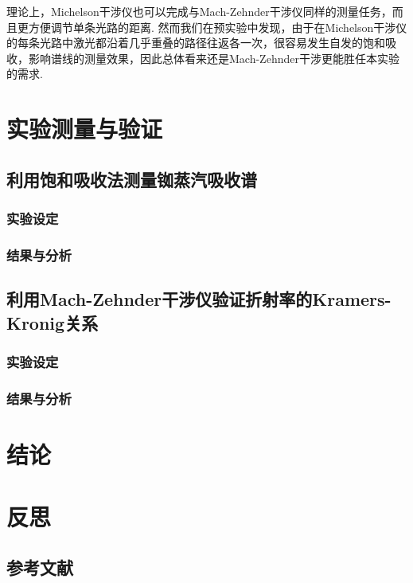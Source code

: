 \documentclass[a4paper, 10pt]{article}
\begin{document}
\begin{multicols}{2}
理论上，Michelson干涉仪也可以完成与Mach-Zehnder干涉仪同样的测量任务，而且更方便调节单条光路的距离. 然而我们在预实验中发现，由于在Michelson干涉仪的每条光路中激光都沿着几乎重叠的路径往返各一次，很容易发生自发的饱和吸收，影响谱线的测量效果，因此总体看来还是Mach-Zehnder干涉更能胜任本实验的需求.

\section{实验测量与验证}

\subsection{利用饱和吸收法测量铷蒸汽吸收谱}

\subsubsection{实验设定}

\subsubsection{结果与分析}

\subsection{利用Mach-Zehnder干涉仪验证折射率的Kramers-Kronig关系}

\subsubsection{实验设定}

\subsubsection{结果与分析}

\section{结论}

\section{反思}

\begin{appendix}
\section{参考文献}
\nocite{*}


\end{appendix}
\end{multicols}
\end{document}

